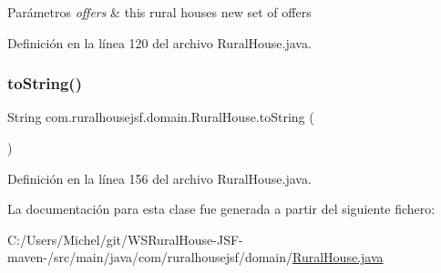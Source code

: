 \begin{DoxyParams}{Parámetros}
{\em offers} & this rural houses new set of offers \\
\hline
\end{DoxyParams}


Definición en la línea 120 del archivo Rural\+House.\+java.

\mbox{\label{classcom_1_1ruralhousejsf_1_1domain_1_1_rural_house_a33c5888213bc3b3f5a4d3c0015f9d033}} 
\subsubsection{\texorpdfstring{toString()}{toString()}}
{\footnotesize\ttfamily String com.\+ruralhousejsf.\+domain.\+Rural\+House.\+to\+String (\begin{DoxyParamCaption}{ }\end{DoxyParamCaption})}



Definición en la línea 156 del archivo Rural\+House.\+java.



La documentación para esta clase fue generada a partir del siguiente fichero\+:\begin{DoxyCompactItemize}
\item 
C\+:/\+Users/\+Michel/git/\+W\+S\+Rural\+House-\/\+J\+S\+F-\/maven-\//src/main/java/com/ruralhousejsf/domain/\mbox{\hyperlink{_rural_house_8java}{Rural\+House.\+java}}\end{DoxyCompactItemize}
